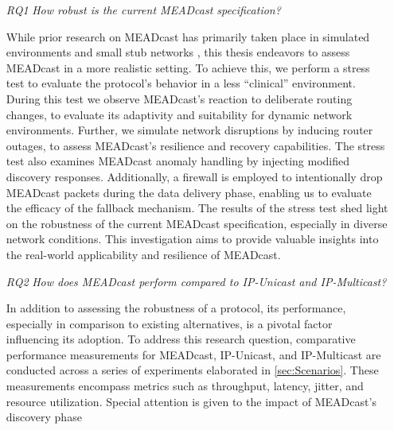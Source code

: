 \begin{enumerate}
    \item[\textit{RQ1}]\label{rq1}
        \textit{How robust is the current MEADcast specification?}\par
        While prior research on MEADcast has primarily taken place in simulated
            environments \cite{meadcast1, meadcast2} and small stub networks
            \cite{sdn_ba}, this thesis endeavors to assess MEADcast in a more
            realistic setting.
        To achieve this, we perform a stress test to evaluate the protocol's
            behavior in a less ``clinical'' environment.
        During this test we observe MEADcast's reaction to deliberate routing
            changes, to evaluate its adaptivity and suitability for dynamic
            network environments.
        Further, we simulate network disruptions by inducing router outages, to
            assess MEADcast's resilience and recovery capabilities.
        The stress test also examines MEADcast anomaly handling by injecting
            modified discovery responses.
        Additionally, a firewall is employed to intentionally drop MEADcast
            packets during the data delivery phase, enabling us to evaluate the
            efficacy of the fallback mechanism.
        The results of the stress test shed light on the robustness of the
            current MEADcast specification, especially in diverse network
            conditions.
        This investigation aims to provide valuable insights into the
            real-world applicability and resilience of MEADcast.
        \item[\textit{RQ2}]\label{rq2}
        \textit{How does MEADcast perform compared to IP-Unicast and
        IP-Multicast?}\par
        In addition to assessing the robustness of a protocol, its performance,
            especially in comparison to existing alternatives, is a pivotal
            factor influencing its adoption.
        To address this research question, comparative performance measurements
            for MEADcast, IP-Unicast, and IP-Multicast are conducted across a
            series of experiments elaborated in \autoref{sec:Scenarios}.
        These measurements encompass metrics such as throughput, latency,
            jitter, and resource utilization.
        Special attention is given to the impact of MEADcast's discovery phase

\end{enumerate}

